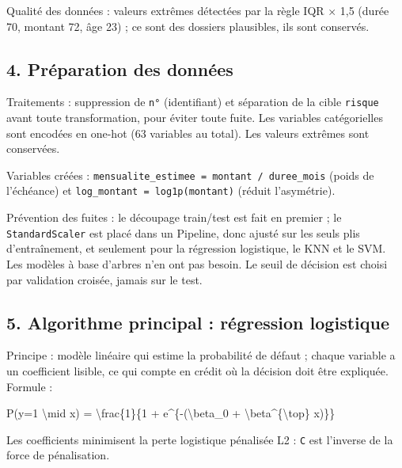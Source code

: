 \documentclass[
]{article}
\newenvironment{Shaded}{}{}
\newcommand{\FunctionTok}[1]{\textcolor[rgb]{0.02,0.16,0.49}{#1}}
\newcommand{\NormalTok}[1]{#1}
\begin{document}
Qualité des données : valeurs extrêmes détectées par la règle IQR × 1,5
(durée 70, montant 72, âge 23) ; ce sont des dossiers plausibles, ils
sont conservés.

\subsection{4. Préparation des
données}\label{pruxe9paration-des-donnuxe9es}

Traitements : suppression de \texttt{n°} (identifiant) et séparation de
la cible \texttt{risque} avant toute transformation, pour éviter toute
fuite. Les variables catégorielles sont encodées en one-hot (63
variables au total). Les valeurs extrêmes sont conservées.

Variables créées :
\texttt{mensualite\_estimee\ =\ montant\ /\ duree\_mois} (poids de
l'échéance) et \texttt{log\_montant\ =\ log1p(montant)} (réduit
l'asymétrie).

Prévention des fuites : le découpage train/test est fait en premier ; le
\texttt{StandardScaler} est placé dans un Pipeline, donc ajusté sur les
seuls plis d'entraînement, et seulement pour la régression logistique,
le KNN et le SVM. Les modèles à base d'arbres n'en ont pas besoin. Le
seuil de décision est choisi par validation croisée, jamais sur le test.

\subsection{5. Algorithme principal : régression
logistique}\label{algorithme-principal-ruxe9gression-logistique}

Principe : modèle linéaire qui estime la probabilité de défaut ; chaque
variable a un coefficient lisible, ce qui compte en crédit où la
décision doit être expliquée. Formule :

\begin{Shaded}
\begin{Highlighting}[]
\NormalTok{P(y=1 }\FunctionTok{\textbackslash{}mid}\NormalTok{ x) = }\FunctionTok{\textbackslash{}frac}\NormalTok{\{1\}\{1 + e\^{}\{{-}(}\FunctionTok{\textbackslash{}beta}\NormalTok{\_0 + }\FunctionTok{\textbackslash{}beta}\NormalTok{\^{}\{}\FunctionTok{\textbackslash{}top}\NormalTok{\} x)\}\}}
\end{Highlighting}
\end{Shaded}

Les coefficients minimisent la perte logistique pénalisée L2 :
\texttt{C} est l'inverse de la force de pénalisation.
\end{document}
